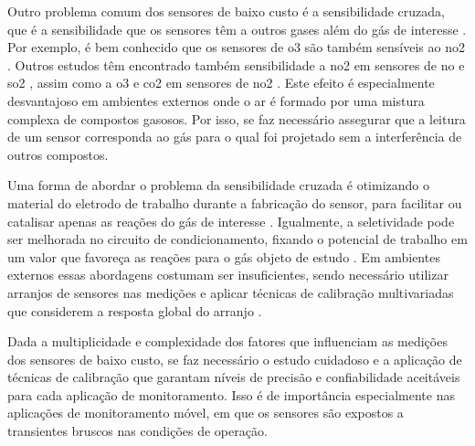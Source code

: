Outro problema comum dos sensores de baixo custo é a sensibilidade cruzada, que é a sensibilidade que os sensores têm a outros gases além do gás de interesse \cite{Maag2018ADeployments}. Por exemplo, é bem conhecido que os sensores de \acrshort{o3} são também sensíveis ao \acrshort{no2} \cite{Pang2017ElectrochemicalMonitoring,Alphasense2019AlphasenseSensors}. Outros estudos têm encontrado também sensibilidade a \acrshort{no2} em sensores de \acrshort{no} e \acrshort{so2} \cite{Lewis2016EvaluatingResearch}, assim como a \acrshort{o3} e \acrshort{co2} em sensores de \acrshort{no2} \cite{Lewis2018Low-costApplications}. Este efeito é especialmente desvantajoso em ambientes externos onde o ar é formado por uma mistura complexa de compostos gasosos. Por isso, se faz necessário assegurar que a leitura de um sensor corresponda ao gás para o qual foi projetado sem a interferência de outros compostos.

Uma forma de abordar o problema da sensibilidade cruzada é otimizando o material do eletrodo de trabalho durante a fabricação do sensor, para facilitar ou catalisar apenas as reações do gás de interesse \cite{R.Stetter2008AmperometricReview}. Igualmente, a seletividade pode ser melhorada no circuito de condicionamento, fixando o potencial de trabalho em um valor que favoreça as reações para o gás objeto de estudo \cite{R.Stetter2008AmperometricReview,Alphasense2013AlphasenseWork}. Em ambientes externos essas abordagens costumam ser insuficientes, sendo necessário utilizar arranjos de sensores nas medições e aplicar técnicas de calibração multivariadas que considerem a resposta global do arranjo \cite{Maag2018ADeployments}.

Dada a multiplicidade e complexidade dos fatores que influenciam as medições dos sensores de baixo custo, se faz necessário o estudo cuidadoso e a aplicação de técnicas de calibração que garantam níveis de precisão e confiabilidade aceitáveis para cada aplicação de monitoramento. Isso é de importância especialmente nas aplicações de monitoramento móvel, em que os sensores são expostos a transientes bruscos nas condições de operação.